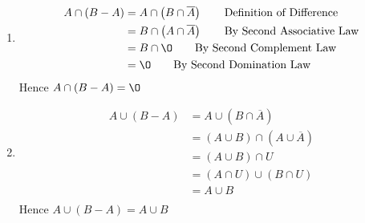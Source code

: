 \documentclass[12pt letter]{report}
\begin{document}
{\begin{enumerate}
    \item
          \begin{align*}
            A \cap \left( B - A \right) & =  A \cap \left( B \cap \overline{A} \right) \tag*{Definition of Difference} \\
                                        & = B \cap \left( A \cap \overline{A} \right) \tag*{By Second Associative Law} \\
                                        & = B \cap \O \tag*{By Second Complement Law}                                  \\
                                        & = \O \tag*{By Second Domination Law}                                         \\
          \end{align*}
          Hence $A \cap \left( B - A \right) = \O $

    \item
          \begin{align*}
            A \cup \left( B - A \right) & = A \cup \left( B \cap \overline{A} \right)  \tag*{Definition of Difference}                       \\
                                        & = \left( A \cup B \right) \cap \left( A \cup \overline{A} \right) \tag*{By First Distributive Law} \\
                                        & = \left( A \cup B \right) \cap U  \tag*{By First Complement Law}                                   \\
                                        & = \left( A \cap U \right) \cup \left( B \cap U  \right) \tag*{By Second
            Distributive Law}                                                                                                                \\
                                        & = A \cup B \tag*{By First Identity Law}                                                            \\
          \end{align*}
          Hence $A \cup \left( B - A \right) = A \cup B $

  \end{enumerate}
}

\end{document}

